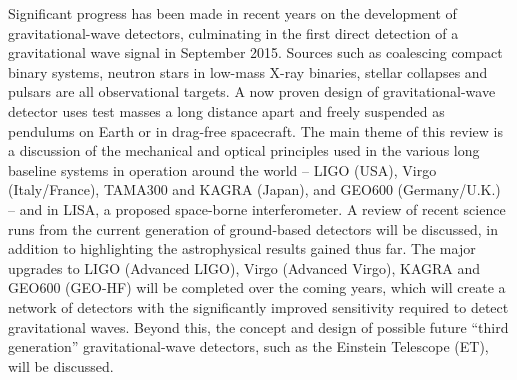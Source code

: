 Significant progress has been made in recent years on the development of
gravitational-wave detectors, culminating in the first direct detection of
a gravitational wave signal in September 2015. Sources such as coalescing compact binary
systems, neutron stars in low-mass X-ray binaries, stellar collapses and
pulsars are all observational targets. A now proven design
of gravitational-wave detector uses test masses a long distance apart and
freely suspended as pendulums on Earth or in drag-free spacecraft.  The
main theme of this review is a discussion of the mechanical and optical
principles used in the various long baseline systems in operation around the
world -- LIGO (USA), Virgo (Italy/France), TAMA300 and KAGRA (Japan), and
GEO600 (Germany/U.K.) -- and in LISA, a proposed space-borne interferometer. A
review of recent science runs from the current generation of ground-based
detectors will be discussed, in addition to highlighting the astrophysical
results gained thus far. The major upgrades to LIGO
(Advanced LIGO), Virgo (Advanced Virgo), KAGRA and GEO600 (GEO-HF) will be
completed over the coming years, which will create a network of detectors
with the significantly improved sensitivity required to detect
gravitational waves. Beyond this, the concept and design of possible
future ``third generation'' gravitational-wave detectors, such as the
Einstein Telescope (ET), will be discussed.
  
  